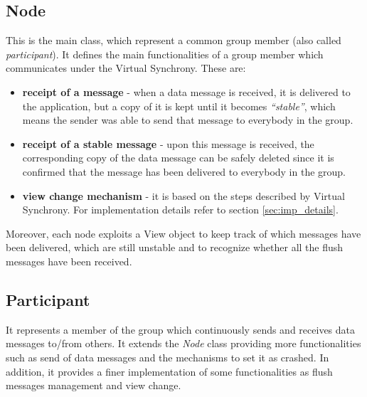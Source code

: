 \documentclass[11pt]{article}
\begin{document}
	\subsection{Node}
	This is the main class, which represent a common group member (also called \textit{participant}). It defines the main functionalities of a group member which communicates under the Virtual Synchrony. These are:
	\begin{itemize}
		\item \textbf{receipt of a message} - when a data message is received, it is delivered to the application, but a copy of it is kept until it becomes \textit{``stable''}, which means the sender was able to send that message to everybody in the group.
		\item \textbf{receipt of a stable message} - upon this message is received, the corresponding copy of the data message can be safely deleted since it is confirmed that the message has been delivered to everybody in the group.
		\item \textbf{view change mechanism} - it is based on the steps described by Virtual Synchrony. For implementation details refer to section \ref{sec:imp_details}.
	\end{itemize}
	Moreover, each node exploits a View object to keep track of which messages have been delivered, which are still unstable and to recognize whether all the flush messages have been received.
	
	\subsection{Participant}
	It represents a member of the group which continuously sends and receives data messages to/from others. It extends the \textit{Node} class providing more functionalities such as send of data messages and the mechanisms to set it as crashed. In addition, it provides a finer implementation of some functionalities as flush messages management and view change.
	
\end{document}
